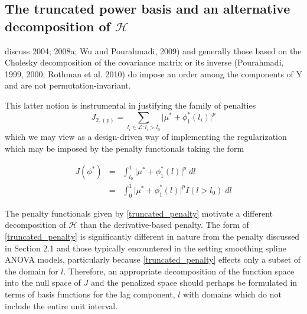 \documentclass[12pt]{article}
\theoremstyle{definition}
\begin{document}
\subsection{The truncated power basis and an alternative decomposition of $\mathcal{H}$}


\citet{bickel2008regularized} discuss 
2004; 2008a; Wu and Pourahmadi, 2009) and generally those based on the Cholesky decomposition
of the covariance matrix or its inverse (Pourahmadi, 1999, 2000; Rothman et al.
2010) do impose an order among the components of Y and are not permutation-invariant.




This latter notion is instrumental in justifying the family of penalties
\[
J_{2,\left(p\right)} = \sum_{  l_i \in \mathcal{L}: l_i > l_0} \vert \mu^* + \phi^*_1\left(l_i\right) \vert^p 
\]
\noindent
which we may view as a design-driven way of implementing the regularization which may be imposed by the penalty functionals taking the form

\begin{eqnarray} \nonumber
J\left(\phi^*\right) &=& \int_{l_0}^1 \vert \mu^* + \phi^*_1\left(l\right) \vert^p\; dl\\
&=& \int_{0}^1 \vert \mu^* + \phi^*_1\left(l\right) \vert^p I\left(l > l_0\right) \; dl \label{eq:truncated_penalty}
\end{eqnarray}

The penalty functionals given by \eqref{truncated_penalty} motivate a different decomposition of $\mathcal{H}$ than the derivative-based penalty. The form of \eqref{truncated_penalty} is significantly different in nature from the penalty discussed in Section 2.1 and those typically encountered in the setting smoothing spline ANOVA models, particularly because \eqref{truncated_penalty} effects only a subset of the domain for $l$. Therefore, an appropriate decomposition of the function space into the null space of $J$ and the penalized space should perhaps be formulated in terms of basis functions for the lag component, $l$ with domains which do not include the entire unit interval. 
\end{document}
